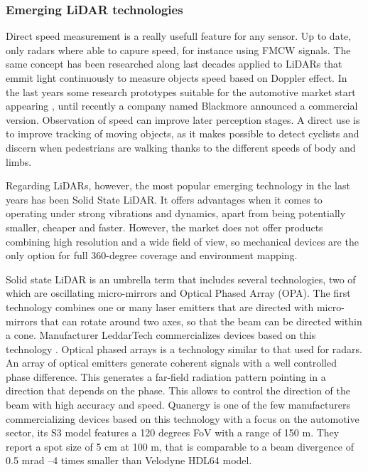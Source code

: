 \subsubsection{Emerging LiDAR technologies}

Direct speed measurement is a really usefull feature for any sensor. Up to date,
only radars where able to capure speed, for instance using FMCW signals.
The same concept has been researched along last decades \cite{Nordin2004}
applied to LiDARs that emmit light continuously to measure objects speed based 
on Doppler effect. In the last years some research prototypes suitable for
the automotive market start appearing \cite{Poulton2016}, until recently
a company named Blackmore announced a commercial version. 
Observation of speed can improve later perception stages. A direct use is to
improve tracking of moving objects, as it makes possible to detect cyclists 
and discern when pedestrians are walking thanks to the different speeds of
body and limbs.

Regarding LiDARs, however, the most popular emerging technology in the last 
years has been Solid State LiDAR. It offers advantages when it comes
to operating under strong vibrations and dynamics, apart from being potentially
smaller, cheaper and faster. 
However, the market does not offer products combining high resolution and a 
wide field of view, so mechanical devices are the only option for full 
360-degree coverage and environment mapping.

Solid state LiDAR is an umbrella term that includes several technologies, two 
of which are oscillating micro-mirrors and Optical Phased Array (OPA).
The first technology combines one or many laser emitters that are directed
with micro-mirrors that can rotate around two axes, so that the beam 
can be directed within a cone. Manufacturer LeddarTech commercializes devices
based on this technology \cite{LeddarTech2016}.
Optical phased arrays \cite{McManamon1996} is a technology similar to that used 
for radars. An array of optical emitters generate coherent signals with a well
controlled phase difference. This generates a far-field radiation pattern 
pointing in a direction that depends on the phase. This allows to control the 
direction of the beam with high accuracy and speed. Quanergy \cite{Eldada2017} 
is one of the few manufacturers commercializing devices based on this technology
with a focus on the automotive sector, its S3 model features a 120 degrees FoV
with a range of 150 m. They report a spot size of 5 cm at 100 m, that is 
comparable to a beam divergence of 0.5 mrad --4 times smaller than Velodyne 
HDL64 model.

